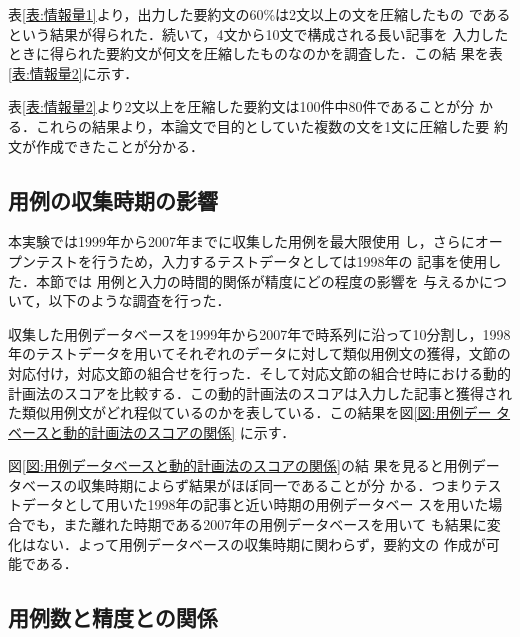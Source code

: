 \documentclass[japanese]{jnlp_1.4}
\begin{document}
表\ref{表:情報量1}より，出力した要約文の60\%は2文以上の文を圧縮したもの
であるという結果が得られた．続いて，4文から10文で構成される長い記事を
入力したときに得られた要約文が何文を圧縮したものなのかを調査した．この結
果を表\ref{表:情報量2}に示す．

\begin{table}[t]
\begin{minipage}[t]{200pt}
\label{表:情報量1}

\end{minipage}
\hfill
\begin{minipage}[t]{200pt}
\label{表:情報量2}

\end{minipage}
\end{table}

表\ref{表:情報量2}より2文以上を圧縮した要約文は100件中80件であることが分
かる．これらの結果より，本論文で目的としていた複数の文を1文に圧縮した要
約文が作成できたことが分かる．

\subsection{用例の収集時期の影響}\label{章:}

本実験では1999年から2007年までに収集した用例を最大限使用
し，さらにオープンテストを行うため，入力するテストデータとしては1998年の
記事を使用した．本節では 用例と入力の時間的関係が精度にどの程度の影響を
与えるかについて，以下のような調査を行った．


収集した用例データベースを1999年から2007年で時系列に沿って10分割し，1998 
年のテストデータを用いてそれぞれのデータに対して類似用例文の獲得，文節の
対応付け，対応文節の組合せを行った．そして対応文節の組合せ時における動的
計画法のスコアを比較する．この動的計画法のスコアは入力した記事と獲得され
た類似用例文がどれ程似ているのかを表している．この結果を図\ref{図:用例デー
タベースと動的計画法のスコアの関係} に示す．

図\ref{図:用例データベースと動的計画法のスコアの関係}の結
果を見ると用例データベースの収集時期によらず結果がほぼ同一であることが分
かる．つまりテストデータとして用いた1998年の記事と近い時期の用例データベー
スを用いた場合でも，また離れた時期である2007年の用例データベースを用いて
も結果に変化はない．よって用例データベースの収集時期に関わらず，要約文の
作成が可能である．


\subsection{用例数と精度との関係}\label{章:用例数を変更}
\end{document}
